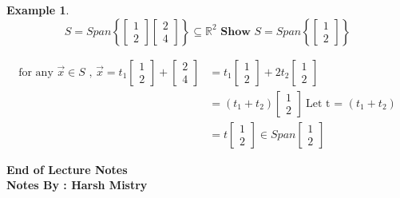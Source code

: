\documentclass[twoside]{article}
\newtheorem{ex}[theorem]{Example}
\begin{document}
\begin{ex}
\[ S = Span \left\{ \begin{bmatrix} 1 \\ 2 \end{bmatrix} \begin{bmatrix} 2 \\ 4 \end{bmatrix} \right\} \subseteq \mathbb{R}^2 \textbf{ Show } S = Span \left\{\begin{bmatrix} 1 \\ 2 \end{bmatrix} \right\} \]

\begin{equation}
\begin{aligned}
\text{for any } \vec{x} \in S \text{ , } \vec{x} = t_1 \begin{bmatrix} 1 \\ 2\end{bmatrix} + \begin{bmatrix} 2 \\ 4 \end{bmatrix} & = t_1 \begin{bmatrix} 1 \\ 2\end{bmatrix} + 2t_2 \begin{bmatrix} 1 \\ 2\end{bmatrix} \\
& = (t_1 + t_2) \begin{bmatrix} 1 \\ 2\end{bmatrix} \ \text{Let t =  } (t_1 + t_2) \\
& = t\begin{bmatrix} 1 \\ 2\end{bmatrix}  \in Span\begin{bmatrix} 1 \\ 2\end{bmatrix} 
\end{aligned}
\end{equation}
\end{ex}



\begin{center}
\textbf{End of Lecture Notes} \\
\textbf{Notes By : Harsh Mistry}
\end{center}
\end{document}
